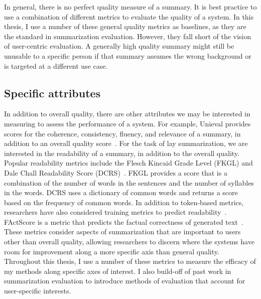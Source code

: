 In general, there is no perfect quality measure of a summary. It is best practice to use a combination of different metrics to evaluate the quality of a system. In this thesis, I use a number of these general quality metrics as baselines, as they are the standard in summarization evaluation. However, they fall short of the vision of user-centric evaluation. A generally high quality summary might still be unusable to a specific person if that summary assumes the wrong background or is targeted at a different use case. 

\subsection{Specific attributes}
In addition to overall quality, there are other attributes we may be interested in measuring to assess the performance of a system. For example, Unieval provides scores for the coherence, consistency, fluency, and relevance of a summary, in addition to an overall quality score~\cite{Zhong2022TowardsAU}. For the task of lay summarization, we are interested in the readability of a summary, in addition to the overall quality. Popular readability metrics include the Flesch Kincaid Grade Level (FKGL) and Dale Chall Readability Score (DCRS)~\cite{goldsack2022making}. FKGL provides a score that is a combination of the number of words in the sentences and the number of syllables in the words. DCRS uses a dictionary of common words and returns a score based on the frequency of common words. In addition to token-based metrics, researchers have also considered training metrics to predict readability~\cite{Imperial2021BERTEF}.
FActScore is a metric that predicts the factual correctness of generated text~\cite{min2023factscore}. These metrics consider aspects of summarization that are important to users other than overall quality, allowing researchers to discern where the systems have room for improvement along a more specific axis than general quality. Throughout this thesis, I use a number of these metrics to measure the efficacy of my methods along specific axes of interest. I also build-off of past work in summarization evaluation to introduce methods of evaluation that account for user-specific interests.